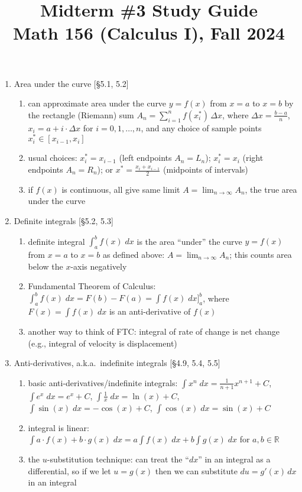 \documentclass[11pt]{article}
\title{Midterm \#3 Study Guide \\ Math 156 (Calculus I), Fall 2024}
\date{}
\begin{document}
\maketitle

\pagestyle{empty}
\thispagestyle{empty}


\begin{enumerate}

\item Area under the curve [\S 5.1, 5.2]
\begin{enumerate}
\item can approximate area under the curve $y=f(x)$ from $x=a$ to $x=b$ by the rectangle (Riemann) sum $A_n = \sum_{i=1}^{n} f(x^{*}_i) \, \Delta x$, where $\Delta x = \frac{b-a}{n}$, $x_i = a + i \cdot \Delta x$ for $i=0,1,\ldots,n$, and any choice of sample points $x^*_i \in [x_{i-1},x_i]$
\item usual choices: $x^*_i = x_{i-1}$ (left endpoints $A_n =L_n$); $x^*_i=x_i$ (right endpoints $A_n=R_n$); or $x^* = \frac{x_i+x_{i-1}}{2}$ (midpoints of intervals)
\item if $f(x)$ is continuous, all give same limit $A=\lim_{n\to \infty} A_n$, the true area under the curve
\end{enumerate}

\item Definite integrals [\S 5.2, 5.3]
\begin{enumerate}
\item definite integral $\int_{a}^{b} f(x) \; dx$ is the area ``under'' the curve $y=f(x)$ from $x=a$ to $x=b$ as defined above: $A=\lim_{n\to \infty} A_n$; this counts area below the $x$-axis negatively
\item Fundamental Theorem of Calculus: $\int_{a}^{b} f(x) \; dx = F(b)-F(a) =\int f(x) \; dx \big ]_{a}^{b}$, where $F(x) = \int f(x) \; dx$ is an anti-derivative of $f(x)$ 
\item another way to think of FTC: integral of rate of change is net change (e.g., integral of velocity is displacement)
\end{enumerate}

\item Anti-derivatives, a.k.a.~indefinite integrals [\S 4.9, 5.4, 5.5]
\begin{enumerate}
\item basic anti-derivatives/indefinite integrals: $\int x^n \; dx = \frac{1}{n+1}x^{n+1}+C$, $\int e^x \; dx = e^x + C$, $\int \frac{1}{x} \; dx = \ln(x) + C$, $\int \sin(x) \; dx = -\cos(x) +C$, $\int \cos(x) \; dx = \sin(x) + C$
\item integral is linear: $\int a\cdot f(x) + b\cdot g(x) \; dx = a\int f(x) \; dx + b \int g(x) \; dx$ for $a,b\in \mathbb{R}$
\item the $u$-substitution technique: can treat the ``$dx$'' in an integral as a differential, so if we let $u=g(x)$ then we can substitute $du = g'(x) \, dx$ in an integral
\end{enumerate}

\end{enumerate}
\end{document}
